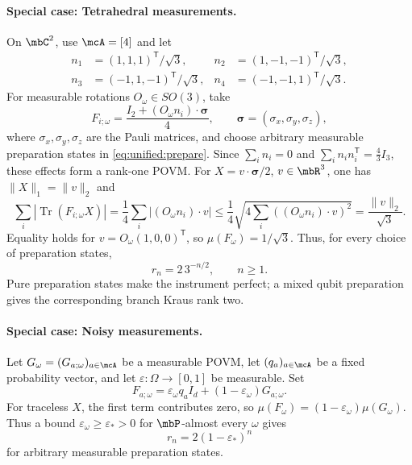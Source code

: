 \documentclass[a4paper]{article}
\numberwithin{equation}{section}   %
\theoremstyle{plain}   %
\theoremstyle{plain}   %
\theoremstyle{examplestyle}
\DeclareMathOperator{\pr}{\mbP}           %
\begin{document}
    \paragraph{Special case: Tetrahedral measurements.}
    \label{par:tetrahedral-measurements}
        On $\mbC^2$, use $\mcA=[4]$ and let
        \[
            \begin{aligned}
             n_1&=(1,1,1)^{\mathsf T}/\sqrt3,
             &n_2&=(1,-1,-1)^{\mathsf T}/\sqrt3,\\
             n_3&=(-1,1,-1)^{\mathsf T}/\sqrt3,
             &n_4&=(-1,-1,1)^{\mathsf T}/\sqrt3.
        \end{aligned}
        \]
        For measurable rotations $O_\omega\in SO(3)$, take
        \[
             F_{i;\omega}
             =\frac{I_2+(O_\omega n_i)\cdot\boldsymbol\sigma}{4},
             \qquad
             \boldsymbol\sigma=(\sigma_x,\sigma_y,\sigma_z),
        \]
        where $\sigma_x,\sigma_y,\sigma_z$ are the Pauli matrices, and choose arbitrary measurable preparation states in \eqref{eq:unified:prepare}.
        Since $\sum_in_i=0$ and  $\sum_in_in_i^{\mathsf T}=\frac43I_3$, these effects form a rank-one POVM.
        For $X=v\cdot\boldsymbol\sigma/2$, $v\in\mbR^3$, one has $\|X\|_1=\|v\|_2$ and
            \[
             \sum_i|\operatorname{Tr}(F_{i;\omega}X)|
             =\frac14\sum_i|(O_\omega n_i)\cdot v|
             \le\frac14\sqrt{4\sum_i((O_\omega n_i)\cdot v)^2}
             =\frac{\|v\|_2}{\sqrt3}.
        \]
        Equality holds for $v=O_\omega(1,0,0)^{\mathsf T}$,  so $\mu(F_\omega)=1/\sqrt3$.
        Thus, for every choice of preparation states,
        \[
             r_n=2\,3^{-n/2},\qquad n\ge1.
        \]
        Pure preparation states make the instrument perfect; a mixed qubit preparation gives the corresponding branch  Kraus rank two.     
    
    \paragraph{Special case: Noisy measurements.}
    \label{par:noisy-measurements}
        Let $G_\omega=(G_{a;\omega})_{a\in\mcA}$ be a measurable POVM, let $(q_a)_{a\in\mcA}$ be a fixed probability vector, and let $\varepsilon:\Omega\to[0,1]$ be measurable.
        Set
        \[
             F_{a;\omega}
             =\varepsilon_\omega q_aI_d
                   +(1-\varepsilon_\omega)G_{a;\omega}.
        \]
        For traceless $X$, the first term contributes zero, so $\mu(F_\omega)=(1-\varepsilon_\omega)\mu(G_\omega)$.
        Thus a bound $\varepsilon_\omega\ge\varepsilon_*>0$ for $\pr$-almost every $\omega$ gives
        \[
             r_n=2(1-\varepsilon_*)^n
        \]
        for arbitrary measurable preparation states.
    
\end{document}
